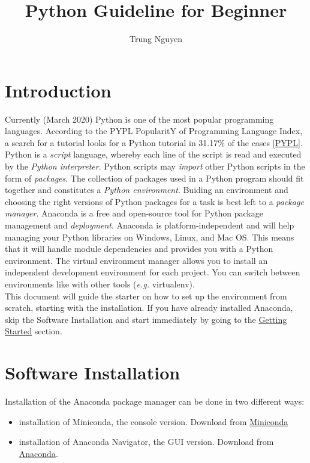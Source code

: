 \documentclass[a4paper,10pt]{article}
\title{Python Guideline for Beginner}
\author{Trung Nguyen}
\date{}
\begin{document}
\maketitle

\tableofcontents

\section{Introduction}

Currently (March 2020) Python is one of the most popular programming languages. According to the PYPL PopularitY of Programming Language Index, a search for a tutorial looks for a Python tutorial in 31.17\% of the cases [\href{http://pypl.github.io/PYPL.html}{PYPL}].\newline
Python is a \emph{script} language, whereby each line of the script is read and executed by the  \emph{Python interpreter}. Python scripts may \emph{import} other Python scripts in the form of \emph {packages}. The collection of packages used in a Python program should fit together and constitutes a \emph{Python environment}. Buiding an environment and choosing the right versions of Python packages for a task is best left to a \emph{package manager}.\newline
Anaconda is a free and open-source tool for Python package management and \emph{deployment}. Anaconda is platform-independent and will help managing your Python libraries on Windows, Linux, and Mac OS. This means that it will handle module dependencies and provides you with a Python environment. The virtual environment manager allows you to install an independent development environment for each project. You can switch between environments like with other tools (\textit{e.g.} virtualenv).\\ 
This document will guide the starter on how to set up the environment from scratch, starting with the installation.
If you have already installed Anaconda, skip the Software Installation and start immediately by going to the \hyperref[sec:start]{Getting Started} section.



\section{ Software Installation}

Installation of the Anaconda package manager can be done in two different ways:
\begin{itemize}
	\item installation of Miniconda, the console version. Download from \href{https://docs.conda.io/en/latest/miniconda.html}{Miniconda}
	\item installation of Anaconda Navigator, the GUI version. Download from \href{https://www.anaconda.com/products/individual}{Anaconda}.
\end{itemize}
\end{document}
